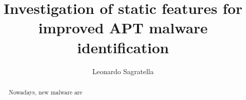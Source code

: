 \documentclass[binding=0.6cm,LaM,oneside]{sapthesis} %
\title{Investigation of static features for improved APT malware identification}
\author{Leonardo Sagratella}
\begin{document}
	\frontmatter
	\maketitle
	\dedication{Dedicato a\\ me stesso una stelle nascente e molto simpatica\\
	 ma soprattutto alla mia stella e luce, FEDERICO DI MAIO, figlio di GIGGINO DI MAIO nostro ex-premier nonchè padre fondatore del reddito di cittadinanza}
 	\begin{abstract}
		Nowadays, new malware are 
	\end{abstract}
	\tableofcontents
	\mainmatter
	
	
	
	
	
	
	
	
	\backmatter
	\cleardoublepage
	
	

	
	
\end{document}
